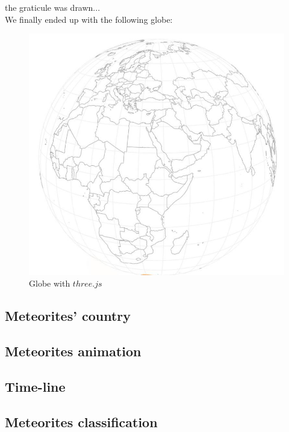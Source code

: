 \documentclass[10pt,conference,compsocconf]{IEEEtran}
\begin{document}
the graticule was drawn...\\


We finally ended up with the following globe: 
\begin{figure}[H]
  \centering
  \includegraphics[width=\columnwidth]{globe.jpg}
  \vspace{-3mm}
  \caption{Globe with $three.js$}
  \label{fig:globe}
\end{figure}


\subsection{Meteorites' country}

\subsection{Meteorites animation}

\subsection{Time-line}


\subsection{Meteorites classification}
\end{document}
